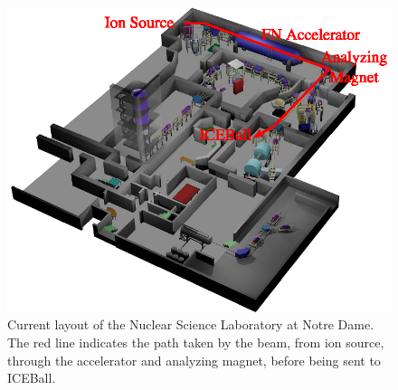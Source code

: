 \begin{figure}[t]
    \centering
    \includegraphics[scale=1.25]{Setup_Figs/NSL_2018_Layout.eps}
    \caption{Current layout of the Nuclear Science Laboratory at Notre Dame. The red line indicates the path taken by the beam, from ion source, through the accelerator and analyzing magnet, before being sent to ICEBall.}
    \label{fig:NSL}
\end{figure}